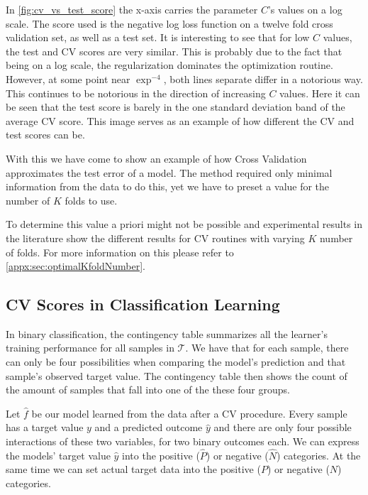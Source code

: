 In \cref{fig:cv_vs_test_score} the x-axis carries the parameter $C$'s values on a log scale. 
The score used is the negative log loss function on a twelve fold cross validation set, as well as a test set. 
It is interesting to see that for low $C$ values, the test and CV scores are very similar. 
This is probably due to the fact that being on a log scale, the regularization dominates the optimization routine.
However, at some point near $\exp^{-4}$, both lines separate differ in a notorious way.
This continues to be notorious in the direction of increasing $C$ values.
Here it can be seen that the test score is barely in the one standard deviation band of the average CV score.
This image serves as an example of how different the CV and test scores can be. 


With this we have come to show an example of how Cross Validation approximates the test error of a model.
The method required only minimal information from the data to do this, yet we have to preset a value for the number of $K$ folds to use. 

To determine this value a priori might not be possible and experimental results in the literature show the different results for CV routines with varying $K$ number of folds. 
For more information on this please refer to \cref{appx:sec:optimalKfoldNumber}.


\subsection{CV Scores in Classification Learning}\label{section:scoring_functions}

In binary classification, the contingency table summarizes all the learner's training performance for all samples in $\mathcal{T}$. 
We have that for each sample, there can only be four possibilities when comparing the model's prediction and that sample's observed target value.
The contingency table then shows the count of the amount of samples that fall into one of the these four groups. 

Let $\hat{f}$ be our model learned from the data after a CV procedure.
Every sample has a target value $y$ and a predicted outcome $\hat{y}$ and there are only four possible interactions of these two variables, for two binary outcomes each.
We can express the models' target value $\hat{y}$ into the positive ($\hat{P}$) or negative ($\hat{N}$) categories. 
At the same time we can set actual target data into the positive ($P$) or negative ($N$) categories.


